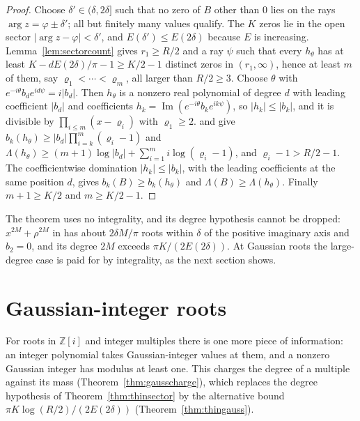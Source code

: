 \documentclass[11pt]{article}
\begin{document}
\begin{proof}
Choose $\delta'\in(\delta,2\delta]$ such that no zero of $B$ other than $0$ lies on the rays
$\arg z=\varphi\pm\delta'$; all but finitely many values qualify.  The $K$
zeros lie in the open sector $|\arg z-\varphi|<\delta'$, and $E(\delta')\le
E(2\delta)$ because $E$ is increasing.  Lemma~\ref{lem:sectorcount} gives
$r_1\ge R/2$ and a ray $\psi$ such that every $h_\theta$ has at least
$K-dE(2\delta)/\pi-1\ge K/2-1$ distinct zeros in $(r_1,\infty)$, hence at least
$m$ of them, say $\varrho_1<\cdots<\varrho_m$, all larger than $R/2\ge3$.
Choose $\theta$ with $e^{-i\theta}b_de^{id\psi}=i|b_d|$.  Then $h_\theta$ is a
nonzero real polynomial of degree $d$ with leading coefficient $|b_d|$ and
coefficients $h_k=\operatorname{Im}(e^{-i\theta}b_ke^{ik\psi})$, so
$|h_k|\le|b_k|$, and it is divisible by $\prod_{i\le m}(x-\varrho_i)$ with
$\varrho_1\ge2$.  \cite[Theorem~3.2]{coefficient-mass} and \cite[Corollary~3.4]{coefficient-mass} give
$b_k(h_\theta)\ge|b_d|\prod_{i=k}^m(\varrho_i-1)$ and
$\Lambda(h_\theta)\ge(m+1)\log|b_d|+\sum_{i=1}^mi\log(\varrho_i-1)$, and
$\varrho_i-1>R/2-1$.  The coefficientwise domination $|h_k|\le|b_k|$, with the
leading coefficients at the same position $d$, gives $b_k(B)\ge b_k(h_\theta)$
and $\Lambda(B)\ge\Lambda(h_\theta)$.  Finally $m+1\ge K/2$ and $m\ge K/2-1$.
\end{proof}

The theorem uses no integrality, and its degree hypothesis cannot be
dropped: $x^{2M}+\rho^{2M}$ in \cite[Proposition~3.2]{coefficient-mass-complex} has about
$2\delta M/\pi$ roots within $\delta$ of the positive imaginary axis and
$b_2=0$, and its degree $2M$ exceeds $\pi K/(2E(2\delta))$.  At Gaussian roots
the large-degree case is paid for by integrality, as the next section shows.

\section{Gaussian-integer roots}\label{sec:gaussian}

For roots in $\mathbb Z[i]$ and integer multiples there is one more piece of
information: an integer polynomial takes Gaussian-integer values at them,
and a nonzero Gaussian integer has modulus at least one.  This charges the
degree of a multiple against its mass (Theorem~\ref{thm:gausscharge}), which
replaces the degree hypothesis of Theorem~\ref{thm:thinsector} by the
alternative bound $\pi K\log(R/2)/(2E(2\delta))$ (Theorem~\ref{thm:thingauss}).
\end{document}
